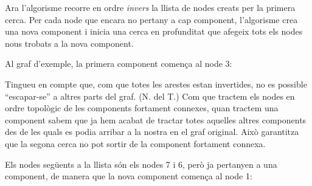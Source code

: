 Ara l'algorisme recorre en ordre \emph{invers} la llista de nodes
creats per la primera cerca. Per cada node que encara no pertany a cap
component, l'algorisme crea una nova component i inicia una cerca en
profunditat que afegeix tots els nodes nous trobats a la nova
component.

Al graf d'exemple, la primera component comença al node 3:


\begin{center}
\end{center}

Tingueu en compte que, com que totes les arestes estan invertides, no
es possible ``escapar-se'' a altres parts del graf. (N. del T.) Com
que tractem els nodes en ordre topològic de les components fortament
connexes, quan tractem una component sabem que ja hem acabat de
tractar totes aquelles altres components des de les quals es podia
arribar a la nostra en el graf original. Això garantitza que la segona
cerca no pot sortir de la component fortament connexa.

Els nodes següents a la llista són els nodes 7 i 6, però ja pertanyen
a una component, de manera que la nova component comença al node 1:

